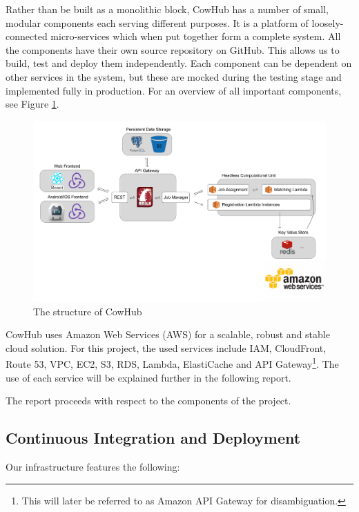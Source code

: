 Rather than be built as a monolithic block, CowHub has a number of small, modular components each serving different purposes. It is a platform of loosely-connected micro-services which when put together form a complete system. All the components have their own source repository on GitHub. This allows us to build, test and deploy them independently. Each component can be dependent on other services in the system, but these are mocked during the testing stage and implemented fully in production. For an overview of all important components, see Figure \ref{fig:structure}.

\begin{figure}
  \includegraphics[width=\textwidth]{sketch/structure.pdf}
  \caption{The structure of CowHub}
  \label{fig:structure}
\end{figure}

CowHub uses Amazon Web Services (AWS) for a scalable, robust and stable cloud solution. For this project, the used services include IAM, CloudFront, Route 53, VPC, EC2, S3, RDS, Lambda, ElastiCache and API Gateway\footnote{This will later be referred to as Amazon API Gateway for disambiguation.}. The use of each service will be explained further in the following report.

The report proceeds with respect to the components of the project.

\subsection{Continuous Integration and Deployment}

Our infrastructure features the following:

